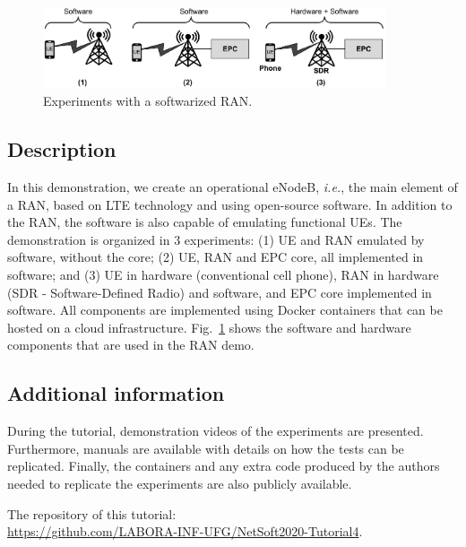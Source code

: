 \begin{figure}[htb] 
 \begin{center}
\includegraphics[width=0.9\textwidth]{figs/demo1-en.pdf}
  \end{center}
\caption{Experiments with a softwarized RAN.}
\label{fig:demo1}
\end{figure}

\subsection*{Description}

In this demonstration, we create an operational eNodeB, \textit{i.e.}, the main element of a RAN, based on LTE technology and using open-source software. In addition to the RAN, the software is also capable of emulating functional UEs. The demonstration is organized in 3 experiments: (1) UE and RAN emulated by software, without the core; (2) UE, RAN and EPC core, all implemented in software; and (3) UE in hardware (conventional cell phone), RAN in hardware (SDR - Software-Defined Radio) and software, and EPC core implemented in software. All components are implemented using Docker containers that can be hosted on a cloud infrastructure. Fig.~\ref{fig:demo1} shows the software and hardware components that are used in the RAN demo.

\subsection*{Additional information}

During the tutorial, demonstration videos of the experiments are presented. Furthermore, manuals are available with details on how the tests can be replicated. Finally, the containers and any extra code produced by the authors needed to replicate the experiments are also publicly available.

The repository of this tutorial:\\
\url{https://github.com/LABORA-INF-UFG/NetSoft2020-Tutorial4}.